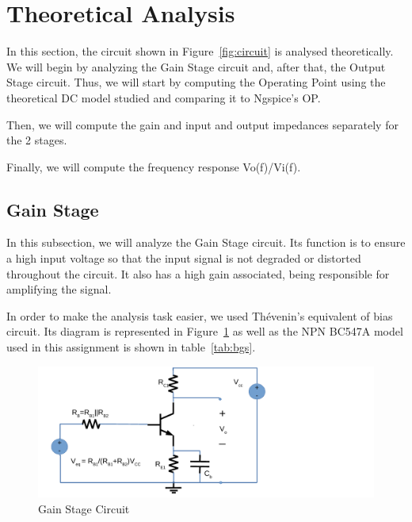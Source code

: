 \section{Theoretical Analysis}
\label{sec:analysis}
In this section, the circuit shown in Figure~\ref{fig:circuit} is analysed
theoretically. We will begin by analyzing the Gain Stage circuit and, after that, the Output Stage circuit.
Thus, we will start by computing the Operating Point using the theoretical DC
model studied and comparing it to Ngspice’s OP.

Then, we will compute the gain and input and output impedances separately for the 2 stages. 

Finally, we will compute the frequency response Vo(f)/Vi(f).

\subsection{Gain Stage}
In this subsection, we will analyze the Gain Stage circuit. Its function is to ensure a high input voltage so that the input signal is not degraded or distorted throughout the circuit. It also has a high gain associated, being responsible for amplifying the signal.

In order to make the analysis task easier, we used Thévenin's equivalent of bias circuit. Its diagram is represented in Figure~\ref{fig:gscircuit} as well as the NPN BC547A model used in this assignment is shown in table~\ref{tab:bgs}.

\begin{figure}[H] \centering
\includegraphics[width=0.8\linewidth]{gainstage.pdf}
\caption{Gain Stage Circuit}                                     %
\label{fig:gscircuit}
\end{figure}

